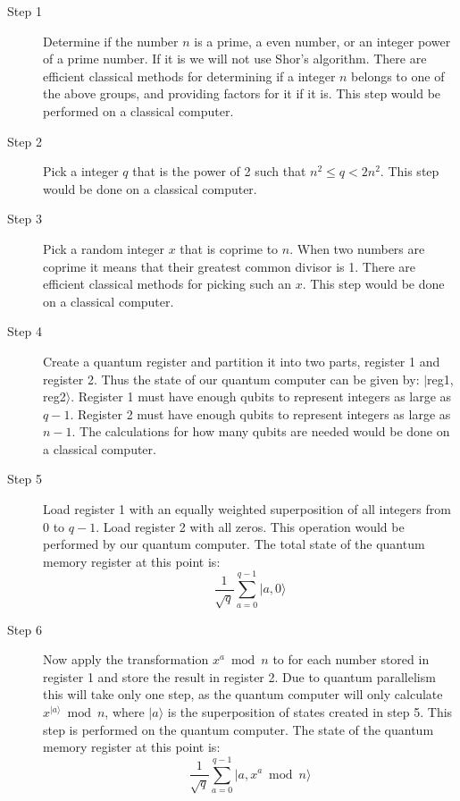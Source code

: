 \documentclass[]{article}
\begin{document}
\begin{description}

\item[Step 1] Determine if the number $n$ is a prime, a even number,
  or an integer power of a prime number.  If it is we will not use
  Shor's algorithm.  There are efficient classical methods for
  determining if a integer $n$ belongs to one of the above groups, and
  providing factors for it if it is.  This step would be performed on
  a classical computer.

\item[Step 2] Pick a integer $q$ that is the power of 2 such that
  $n^{2} \leq q < 2n^{2}$.  This step would be done on a classical
  computer.

\item[Step 3] Pick a random integer $x$ that is coprime to $n$.  When
  two numbers are coprime it means that their greatest common divisor
  is 1.  There are efficient classical methods for picking such an
  $x$.  This step would be done on a classical computer.

\item[Step 4] Create a quantum register and partition it into two
  parts, register 1 and register 2.  Thus the state of our quantum
  computer can be given by: $|$reg1, reg2$ \rangle$.  Register 1 must
  have enough qubits to represent integers as large as $q - 1$.
  Register 2 must have enough qubits to represent integers as large as
  $n - 1$.  The calculations for how many qubits are needed would be
  done on a classical computer.

\item[Step 5] Load register 1 with an equally weighted superposition
  of all integers from 0 to $q - 1$.  Load register 2 with all zeros.
  This operation would be performed by our quantum computer.  The
  total state of the quantum memory register at this point is:
	\[\frac{1}{\sqrt{q}}\sum_{a = 0}^{q - 1} |a, 0 \rangle\]

\item[Step 6] Now apply the transformation $x^{a} \bmod n$ to for each
  number stored in register 1 and store the result in register 2.  Due
  to quantum parallelism this will take only one step, as the quantum
  computer will only calculate $x^{|a \rangle } \bmod n$, where $|a
  \rangle $ is the superposition of states created in step 5.  This
  step is performed on the quantum computer.  The state of the quantum
  memory register at this point is:
	\[\frac{1}{\sqrt{q}}\sum_{a=0}^{q-1}|a,x^{a} \bmod n \rangle \]


\end{description}
\end{document}
